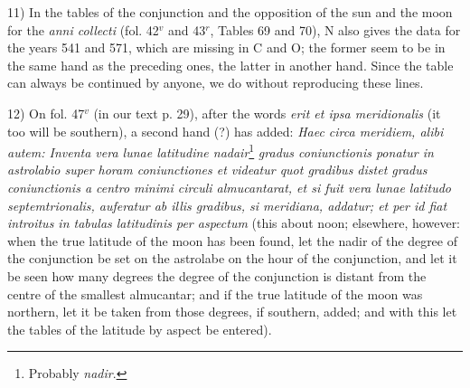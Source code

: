 \documentclass[11pt]{article}
\newcommand{\Pg}[1]{\marginpar{\footnotesize\color{gray}#1}}
\begin{document}
\par \Pg{XX}11) In the tables of the conjunction and the opposition of the sun and the moon for the \emph{anni collecti} (fol. 42$^{v}$ and 43$^{r}$, Tables 69 and 70), N also gives the data for the years 541 and 571, which are missing in C and O; the former seem to be in the same hand as the preceding ones, the latter in another hand. Since the table can always be continued by anyone, we do without reproducing these lines.\par
\par 12) On fol. 47$^{v}$ (in our text p. 29), after the words \emph{erit et ipsa meridionalis} (it too will be southern), a second hand (?) has added: \emph{Haec circa meridiem, alibi autem: Inventa vera lunae latitudine nadair}\footnote{Probably \emph{nadir}.} \emph{gradus coniunctionis ponatur in astrolabio super horam coniunctiones et videatur quot gradibus distet gradus coniunctionis a centro minimi circuli almucantarat, et si fuit vera lunae latitudo septemtrionalis, auferatur ab illis gradibus, si meridiana, addatur; et per id fiat introitus in tabulas latitudinis per aspectum} (this about noon; elsewhere, however: when the true latitude of the moon has been found, let the nadir of the degree of the conjunction be set on the astrolabe on the hour of the conjunction, and let it be seen how many degrees the degree of the conjunction is distant from the centre of the smallest almucantar; and if the true latitude of the moon was northern, let it be taken from those degrees, if southern, added; and with this let the tables of the latitude by aspect be entered).\par
\end{document}
